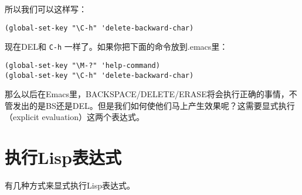 所以我们可以这样写：

\begin{verbatim}
(global-set-key "\C-h" 'delete-backward-char)
\end{verbatim}

现在DEL和 \verb|C-h| 一样了。如果你把下面的命令放到.emacs里：

\begin{verbatim}
(global-set-key "\M-?" 'help-command)
(global-set-key "\C-h" 'delete-backward-char)
\end{verbatim}

那么以后在Emacs里，BACKSPACE/DELETE/ERASE将会执行正确的事情，不管发出的是BS还是DEL。但是我们如何使他们马上产生效果呢？这需要显式执行（explicit evaluation）这两个表达式。

\section{执行Lisp表达式}
\label{section:01-Evaluating-Lisp-Expressions}

有几种方式来显式执行Lisp表达式。

